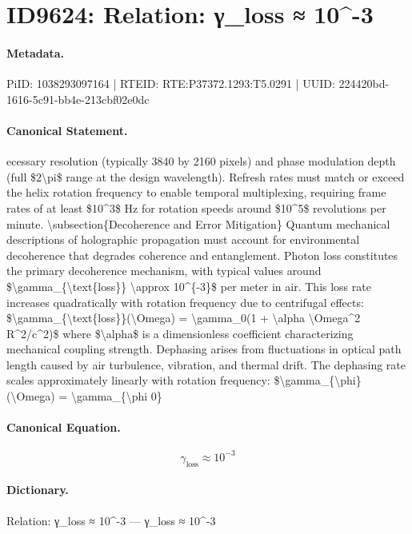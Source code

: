 \section*{ID9624: Relation: γ\_loss ≈ 10\textasciicircum{}-3}
\paragraph{Metadata.}
PiID: 1038293097164 | RTEID: RTE:P37372.1293:T5.0291 | UUID: 224420bd-1616-5c91-bb4e-213cbf02e0dc

\paragraph{Canonical Statement.}
ecessary resolution (typically 3840 by 2160 pixels) and phase modulation depth (full \$2\textbackslash{}pi\$ range at the design wavelength). Refresh rates must match or exceed the helix rotation frequency to enable temporal multiplexing, requiring frame rates of at least \$10\textasciicircum{}3\$ Hz for rotation speeds around \$10\textasciicircum{}5\$ revolutions per minute. \textbackslash{}subsection\{Decoherence and Error Mitigation\} Quantum mechanical descriptions of holographic propagation must account for environmental decoherence that degrades coherence and entanglement. Photon loss constitutes the primary decoherence mechanism, with typical values around \$\textbackslash{}gamma\_\{\textbackslash{}text\{loss\}\} \textbackslash{}approx 10\textasciicircum{}\{-3\}\$ per meter in air. This loss rate increases quadratically with rotation frequency due to centrifugal effects: \$\textbackslash{}gamma\_\{\textbackslash{}text\{loss\}\}(\textbackslash{}Omega) = \textbackslash{}gamma\_0(1 + \textbackslash{}alpha \textbackslash{}Omega\textasciicircum{}2 R\textasciicircum{}2/c\textasciicircum{}2)\$ where \$\textbackslash{}alpha\$ is a dimensionless coefficient characterizing mechanical coupling strength. Dephasing arises from fluctuations in optical path length caused by air turbulence, vibration, and thermal drift. The dephasing rate scales approximately linearly with rotation frequency: \$\textbackslash{}gamma\_\{\textbackslash{}phi\}(\textbackslash{}Omega) = \textbackslash{}gamma\_\{\textbackslash{}phi 0\}

\paragraph{Canonical Equation.}
\[
\gamma_{\text{loss}} \approx 10^{-3}
\]

\paragraph{Dictionary.}
Relation: γ\_loss ≈ 10\textasciicircum{}-3 — γ\_loss ≈ 10\textasciicircum{}-3

